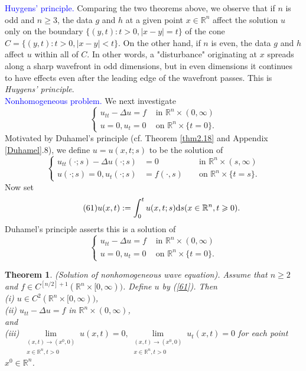 \documentclass[hyperref,UTF8,12pt]{article}
\numberwithin{equation}{subsection}
\theoremstyle{plain}
\newtheorem{theorem}{Theorem}
\theoremstyle{definition}
\numberwithin{theorem}{section}
\numberwithin{lemma}{section}
\numberwithin{proposition}{section}
\numberwithin{remark}{section}
\numberwithin{corollary}{section}
\numberwithin{definition}{section}
\numberwithin{problem}{section}
\numberwithin{example}{section}
\def\dif{\textup{d}}
\newcommand{\limls}{\lim\limits}
\newcommand{\mr}{\mathbb{R}}
\renewcommand{\geq}{\geqslant}
\begin{document}
\noindent\textcolor{blue}{Huygens' principle.} Comparing the two theorems above, we observe that if $n$ is odd and $n\geq3$, the data $g$ and $h$ at a given point $x\in\mr^n$ affect the solution $u$ only on the boundary $\{(y,t):t>0,|x-y|=t\}$ of the cone $C=\{(y,t):t >0,|x-y|<t\}$. On the other hand, if $n$ is even, the data $g$ and $h$ affect $u$ within all of $C$. In other words, a "disturbance" originating at $x$ spreads along a sharp wavefront in odd dimensions, but in even dimensions it continues to have effects even after the leading edge of the wavefront passes. This is \emph{Huygens' principle}.\\[5pt]
\noindent\textcolor{blue}{Nonhomogeneous problem.} We next investigate\[\begin{cases}
u_{tt}-\Delta u=f & \text{ in } \mr^n\times(0,\infty) \\ u=0,u_t=0& \text{ on } \mr^n \times\{t=0\}.\end{cases}\tag{60}\label{60}\]Motivated by Duhamel's principle (cf. Theorem \ref{thm2.18} and Appendix \ref{Duhamel}.8), we define $u=u(x,t;s)$ to be the solution of \[\left\{\begin{aligned}
u_{tt}(\cdot;s)-\Delta u(\cdot;s)&=0 & & \text{ in } \mr^n\times(s,\infty)\\
u(\cdot;s)=0,u_t(\cdot;s)&=f(\cdot,s) & & \text{ on } \mr^n\times\{t=s\}.
\end{aligned}\right.\]Now set\[\tag{61}u(x,t):=\int_0^tu(x,t;s)\dif s(x\in\mr^n,t\geq0) .\label{61}\]Duhamel's principle asserts this is a solution of\[\left\{\begin{array}{cl}
u_{tt}-\Delta u=f& \text{ in } \mr^n\times(0,\infty)\\
u=0,u_t=0& \text{ on } \mr^n\times\{t=0\}.
\end{array}\right.\tag{62}\label{62}\]
\begin{theorem}
(Solution of nonhomogeneous wave equation). Assume that $n\geq2$ and $f\in C^{[n/2]+1} (\mr^n\times[0,\infty))$. Define $u$ by \textup{(\ref{61})}. Then\\
\textup{(i)} $u\in C^2(\mr^n\times[0,\infty))$,\\
\textup{(ii)} $u_{tt}-\Delta u=f$ in $\mr^n\times(0,\infty)$,\\and\\ \textup{(iii)}
$\limls_{\substack{(x,t)\to(x^0,0)\\x\in\mr^n,t>0}}u(x,t)=0,\limls_{\substack {(x,t)\to(x^0,0)\\x\in\mr^n,t>0}}u_t(x,t)=0$ for each point $x^0\in\mr^n$.
\end{theorem}
\end{document}
